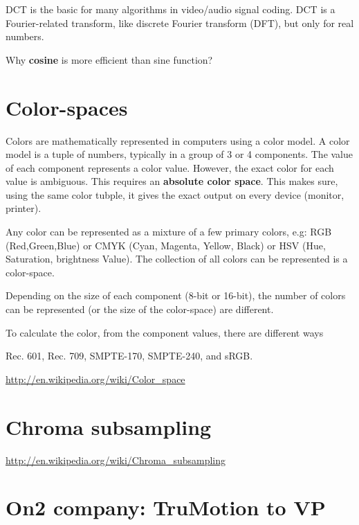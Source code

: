 DCT is the basic for many algorithms in video/audio signal coding. DCT is
a Fourier-related transform, like discrete Fourier transform (DFT), but only for
real numbers.

Why {\bf cosine} is more efficient than sine function?




\section{Color-spaces}

Colors are mathematically represented in computers using a color model. A color
model is a tuple of numbers, typically in a group of 3 or 4 components. The
value of each component represents a color value. However, the exact color for
each value is ambiguous. This requires an {\bf absolute color space}. This makes
sure, using the same color tubple, it gives the exact output on every device
(monitor, printer). 

Any color can be represented as a mixture of a few primary colors, e.g: RGB
(Red,Green,Blue) or CMYK (Cyan, Magenta, Yellow, Black) or HSV (Hue,
Saturation, brightness Value). The collection of all colors can be represented
is a color-space. 

Depending on the size of each component (8-bit or 16-bit), the number of colors
can be represented (or the size of the color-space) are different.

To calculate the color, from the component values, there are different ways



Rec. 601, Rec. 709, SMPTE-170, SMPTE-240, and sRGB.


\url{http://en.wikipedia.org/wiki/Color_space}


\section{Chroma subsampling}
\label{sec:chroma_sampling}


\url{http://en.wikipedia.org/wiki/Chroma_subsampling}

\section{On2 company: TruMotion to VP}
\label{sec:TruMotion_VP}

